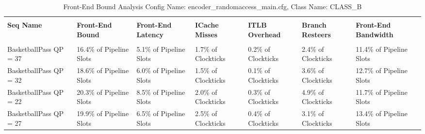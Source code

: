 \documentclass{article}%
\begin{document}
\begin{longtabu}{| X[l] | X[l] | X[l] | X[l] | X[l] | X[l] | X[l] |}%
\caption{%
Front{-}End Bound Analysis\newline%
 Config Name: encoder\_randomaccess\_main.cfg,\newline%
 Class Name: CLASS\_B\newline%
%
}%
\hline%
&&&&&&\\%
\textbf{Seq Name}&\textbf{Front{-}End Bound}&\textbf{Front{-}End Latency}&\textbf{ICache Misses}&\textbf{ITLB Overhead}&\textbf{Branch Resteers}&\textbf{Front{-}End Bandwidth}\\%
&&&&&&\\%
\hline%
\endhead%
BasketballPass\newline%
 QP = 37&16.4\% of Pipeline Slots&5.1\% of Pipeline Slots&1.7\% of Clockticks&0.2\% of Clockticks&2.4\% of Clockticks&11.4\% of Pipeline Slots\\%
\hline%
BasketballPass\newline%
 QP = 32&18.6\% of Pipeline Slots&6.0\% of Pipeline Slots&1.5\% of Clockticks&0.1\% of Clockticks&3.6\% of Clockticks&12.7\% of Pipeline Slots\\%
\hline%
BasketballPass\newline%
 QP = 22&20.3\% of Pipeline Slots&8.5\% of Pipeline Slots&2.0\% of Clockticks&0.3\% of Clockticks&4.9\% of Clockticks&11.7\% of Pipeline Slots\\%
\hline%
BasketballPass\newline%
 QP = 27&19.9\% of Pipeline Slots&6.5\% of Pipeline Slots&2.5\% of Clockticks&0.4\% of Clockticks&3.1\% of Clockticks&13.4\% of Pipeline Slots\\%
\hline%
\end{longtabu}%
\newpage%
\end{document}
